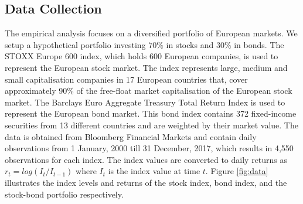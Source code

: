 \documentclass[a4paper,12pt]{article}
\theoremstyle{plain}
\begin{document}
\subsection{Data Collection}
The empirical analysis focuses on a diversified portfolio of European markets. We setup a hypothetical portfolio investing $70\%$ in stocks and $30\%$ in bonds. The STOXX Europe 600 index, which holds 600 European companies, is used to represent the European stock market. The index represents large, medium and small capitalisation companies in 17 European countries that, cover approximately 90$\%$ of the free-float market capitalisation of the European stock market. The Barclays Euro Aggregate Treasury Total Return Index is used to represent the European bond market. This bond index contains 372 fixed-income securities from 13 different countries and are weighted by their market value. The data is obtained from Bloomberg Financial Markets and contain daily observations from 1 January, 2000 till 31 December, 2017, which results in 4,550 observations for each index. The index values are converted to daily returns as $r_t = log(I_t/I_{t-1})$ where $I_t$ is the index value at time $t$. Figure \ref{fig:data} illustrates the index levels and returns of the stock index, bond index, and the stock-bond portfolio respectively. 
\end{document}
